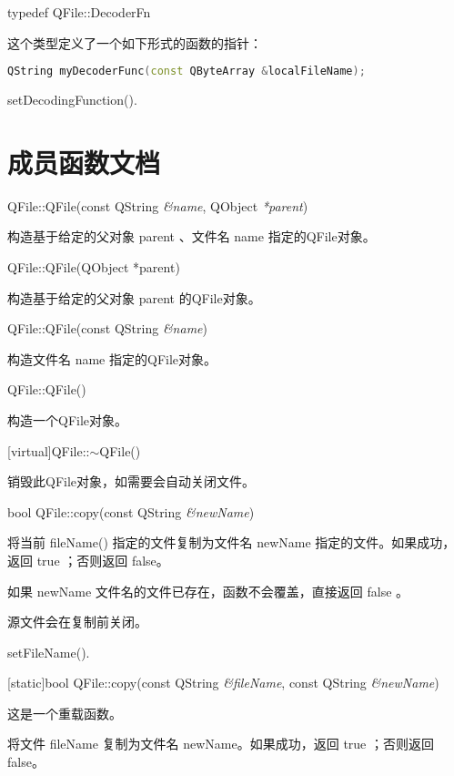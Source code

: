 typedef QFile::DecoderFn

这个类型定义了一个如下形式的函数的指针：


\begin{lstlisting}[language=C++]
QString myDecoderFunc(const QByteArray &localFileName);
\end{lstlisting}


\begin{seeAlso}
setDecodingFunction().
\end{seeAlso} 

\splitLine

\section{成员函数文档}

QFile::QFile(const QString \emph{\&name}, QObject \emph{*parent})

构造基于给定的父对象 parent 、文件名 name 指定的QFile对象。

QFile::QFile(QObject *parent)

构造基于给定的父对象 parent 的QFile对象。

QFile::QFile(const QString \emph{\&name})

构造文件名 name 指定的QFile对象。

QFile::QFile()

构造一个QFile对象。

[virtual]QFile::$\sim$QFile()

销毁此QFile对象，如需要会自动关闭文件。

bool QFile::copy(const QString \emph{\&newName})

将当前 fileName() 指定的文件复制为文件名 newName 指定的文件。如果成功，返回 true ；否则返回 false。


\begin{notice}
如果 newName 文件名的文件已存在，函数不会覆盖，直接返回 false 。
\end{notice} 

源文件会在复制前关闭。

\begin{seeAlso}
setFileName().
\end{seeAlso} 

[static]bool QFile::copy(const QString \emph{\&fileName}, const QString \emph{\&newName})

这是一个重载函数。

将文件 fileName 复制为文件名 newName。如果成功，返回 true ；否则返回 false。


